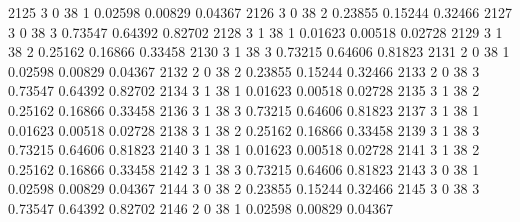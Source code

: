 \documentclass{article}
\begin{document}
\begin{Woutput}
2125      3       0      38       1       0.02598    0.00829    0.04367
2126      3       0      38       2       0.23855    0.15244    0.32466
2127      3       0      38       3       0.73547    0.64392    0.82702
2128      3       1      38       1       0.01623    0.00518    0.02728
2129      3       1      38       2       0.25162    0.16866    0.33458
2130      3       1      38       3       0.73215    0.64606    0.81823
2131      2       0      38       1       0.02598    0.00829    0.04367
2132      2       0      38       2       0.23855    0.15244    0.32466
2133      2       0      38       3       0.73547    0.64392    0.82702
2134      3       1      38       1       0.01623    0.00518    0.02728
2135      3       1      38       2       0.25162    0.16866    0.33458
2136      3       1      38       3       0.73215    0.64606    0.81823
2137      3       1      38       1       0.01623    0.00518    0.02728
2138      3       1      38       2       0.25162    0.16866    0.33458
2139      3       1      38       3       0.73215    0.64606    0.81823
2140      3       1      38       1       0.01623    0.00518    0.02728
2141      3       1      38       2       0.25162    0.16866    0.33458
2142      3       1      38       3       0.73215    0.64606    0.81823
2143      3       0      38       1       0.02598    0.00829    0.04367
2144      3       0      38       2       0.23855    0.15244    0.32466
2145      3       0      38       3       0.73547    0.64392    0.82702
2146      2       0      38       1       0.02598    0.00829    0.04367


\end{Woutput}
\end{document}
